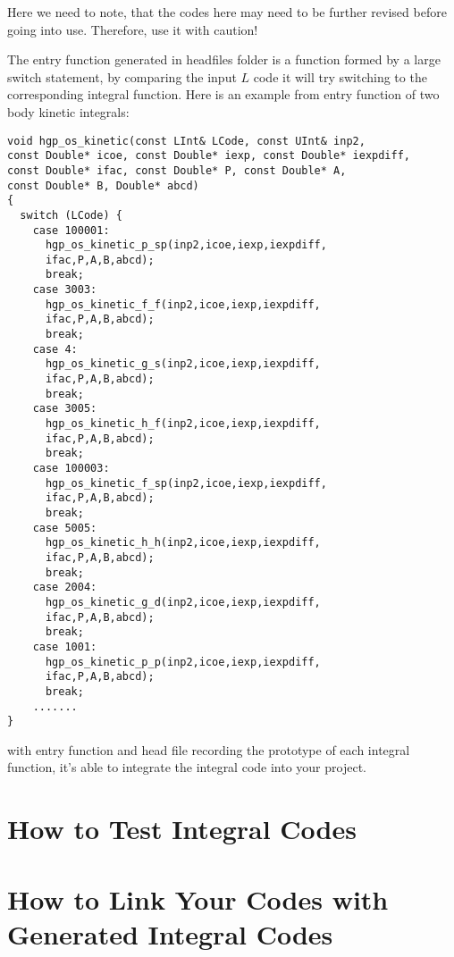 Here we need to note, that the codes here may need to be further revised before going into
use. Therefore, use it with caution!

The entry function generated in headfiles folder is a function formed by a large
switch statement, by comparing the input $L$ code it will try switching to the 
corresponding integral function. Here is an example from entry function of 
two body kinetic integrals:
\begin{verbatim}
void hgp_os_kinetic(const LInt& LCode, const UInt& inp2, 
const Double* icoe, const Double* iexp, const Double* iexpdiff, 
const Double* ifac, const Double* P, const Double* A, 
const Double* B, Double* abcd)
{
  switch (LCode) {
    case 100001:
      hgp_os_kinetic_p_sp(inp2,icoe,iexp,iexpdiff,
      ifac,P,A,B,abcd);
      break;
    case 3003:
      hgp_os_kinetic_f_f(inp2,icoe,iexp,iexpdiff,
      ifac,P,A,B,abcd);
      break;
    case 4:
      hgp_os_kinetic_g_s(inp2,icoe,iexp,iexpdiff,
      ifac,P,A,B,abcd);
      break;
    case 3005:
      hgp_os_kinetic_h_f(inp2,icoe,iexp,iexpdiff,
      ifac,P,A,B,abcd);
      break;
    case 100003:
      hgp_os_kinetic_f_sp(inp2,icoe,iexp,iexpdiff,
      ifac,P,A,B,abcd);
      break;
    case 5005:
      hgp_os_kinetic_h_h(inp2,icoe,iexp,iexpdiff,
      ifac,P,A,B,abcd);
      break;
    case 2004:
      hgp_os_kinetic_g_d(inp2,icoe,iexp,iexpdiff,
      ifac,P,A,B,abcd);
      break;
    case 1001:
      hgp_os_kinetic_p_p(inp2,icoe,iexp,iexpdiff,
      ifac,P,A,B,abcd);
      break;
    .......
}
\end{verbatim} 
with entry function and head file recording the prototype of each integral
function, it's able to integrate the integral code into your project.



\section{How to Test Integral Codes}

\section{How to Link Your Codes with Generated Integral Codes}
